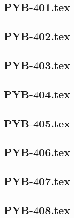 \renewcommand{\xxexo}{PYB-401.tex} 
\subsection*{\xxexo} 
\graphicspath{{../../exospython_bases/equadiffs/\xxexo/}}
 
 
\renewcommand{\xxexo}{PYB-402.tex} 
\subsection*{\xxexo} 
\graphicspath{{../../exospython_bases/equadiffs/\xxexo/}}
 
 
\renewcommand{\xxexo}{PYB-403.tex} 
\subsection*{\xxexo} 
\graphicspath{{../../exospython_bases/equadiffs/\xxexo/}}
 
 
\renewcommand{\xxexo}{PYB-404.tex} 
\subsection*{\xxexo} 
\graphicspath{{../../exospython_bases/equadiffs/\xxexo/}}
 
 
\renewcommand{\xxexo}{PYB-405.tex} 
\subsection*{\xxexo} 
\graphicspath{{../../exospython_bases/equadiffs/\xxexo/}}
 
 
\renewcommand{\xxexo}{PYB-406.tex} 
\subsection*{\xxexo} 
\graphicspath{{../../exospython_bases/equadiffs/\xxexo/}}
 
 
\renewcommand{\xxexo}{PYB-407.tex} 
\subsection*{\xxexo} 
\graphicspath{{../../exospython_bases/equadiffs/\xxexo/}}
 
 
\renewcommand{\xxexo}{PYB-408.tex} 
\subsection*{\xxexo} 
\graphicspath{{../../exospython_bases/equadiffs/\xxexo/}}
 
 
